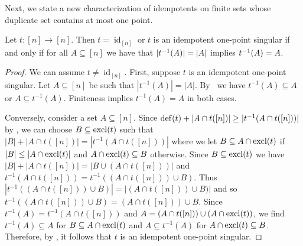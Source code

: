 Next, we state a new characterization of idempotents on finite sets whose duplicate set contains at most one point.

\begin{proposition} 
\label{prelim:prop:one-attractor-idempotent-fin}
  Let $t \colon [n] \to [n]$. 
  Then $t = \operatorname{id}_{[n]}$ or $t$ is an idempotent one-point singular
  if and only if 
  for all $A \subseteq [n]$
  we have that $|\applyfunc{A}{t^{-1}}| = |A|$
  implies $\applyfunc{A}{t^{-1}} = A$.		
\end{proposition}
\begin{proof}
	We can assume $t \ne \operatorname{id}_{[n]}$.
	First, suppose $t$ is an idempotent one-point singular. Let $A \subseteq [n]$ be such that
	$|t^{-1}(A)| = |A|$.
	By~ we have $t^{-1}(A) \subseteq A$ or $A \subseteq t^{-1}(A)$.
	Finiteness implies $t^{-1}(A) = A$ in both cases.
		
	Conversely, consider a set $A \subseteq [n]$.
	Since $\defect{t} + |A \cap t([n])| \ge |t^{-1}(A \cap t([n]))|$ by ,
	we can choose $B \subseteq \excl{t}$
	such that $|B| + |A \cap t([n])| = |t^{-1}(A \cap t([n]))|$
	where we let $B \subseteq A \cap \excl{t}$ if $|B| \le |A \cap \excl{t}|$
	and $A \cap \excl{t} \subseteq B$ otherwise.
	Since $B \subseteq \excl{t}$
	we have $|B| + |A \cap t([n])| = |B \cup (A \cap t([n]))|$
	and $t^{-1}(A \cap t([n])) = t^{-1}(( A \cap t([n]) ) \cup B)$.
	Thus $| t^{-1}(( A \cap t([n]) ) \cup B) | = | ( A \cap t([n]) ) \cup B) |$
	and so $t^{-1}( ( A \cap t([n]) ) \cup B) = ( A \cap t([n]) ) \cup B$.
	Since $t^{-1}(A) = t^{-1}(A \cap t([n]))$
	and $A = (A \cap t([n])) \cup (A \cap \excl{t})$,
	we find $t^{-1}(A) \subseteq A$ for $B \subseteq A \cap \excl{t}$
	and $A \subseteq t^{-1}(A)$
	for $A \cap \excl{t}\subseteq B$.
	Therefore, by , 
	it follows that $t$ is an idempotent one-point singular.
\end{proof}

